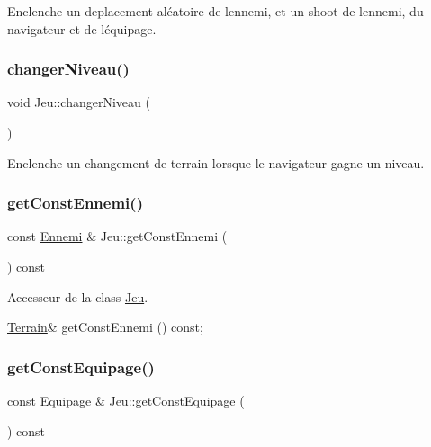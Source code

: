 Enclenche un deplacement aléatoire de l\textquotesingle{}ennemi, et un shoot de l\textquotesingle{}ennemi, du navigateur et de l\textquotesingle{}équipage. 

\mbox{\label{class_jeu_aa00e3f0a90d6b38c83c16700cdd15190}} 
\subsubsection{\texorpdfstring{changer\+Niveau()}{changerNiveau()}}
{\footnotesize\ttfamily void Jeu\+::changer\+Niveau (\begin{DoxyParamCaption}{ }\end{DoxyParamCaption})}



Enclenche un changement de terrain lorsque le navigateur gagne un niveau. 

\mbox{\label{class_jeu_a9266f571dc8cfacdf01e6f13d8a13568}} 
\subsubsection{\texorpdfstring{get\+Const\+Ennemi()}{getConstEnnemi()}}
{\footnotesize\ttfamily const \hyperlink{class_ennemi}{Ennemi} \& Jeu\+::get\+Const\+Ennemi (\begin{DoxyParamCaption}{ }\end{DoxyParamCaption}) const}



Accesseur de la class \hyperlink{class_jeu}{Jeu}. 

\hyperlink{class_terrain}{Terrain}\& get\+Const\+Ennemi () const; \mbox{\label{class_jeu_a8831cd95b6bf8984712e212a9db537cf}} 
\subsubsection{\texorpdfstring{get\+Const\+Equipage()}{getConstEquipage()}}
{\footnotesize\ttfamily const \hyperlink{class_equipage}{Equipage} \& Jeu\+::get\+Const\+Equipage (\begin{DoxyParamCaption}{ }\end{DoxyParamCaption}) const}



